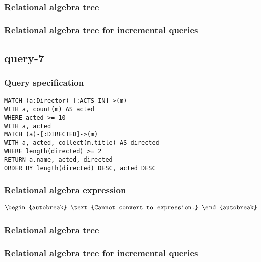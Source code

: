 \subsubsection*{Relational algebra tree}


\subsubsection*{Relational algebra tree for incremental queries}

\subsection{query-7}

\subsubsection*{Query specification}

\begin{lstlisting}
MATCH (a:Director)-[:ACTS_IN]->(m)
WITH a, count(m) AS acted
WHERE acted >= 10
WITH a, acted
MATCH (a)-[:DIRECTED]->(m)
WITH a, acted, collect(m.title) AS directed
WHERE length(directed) >= 2
RETURN a.name, acted, directed
ORDER BY length(directed) DESC, acted DESC
\end{lstlisting}

\subsubsection*{Relational algebra expression}

\begin{align*}
\begin{autobreak}
\text{Cannot convert to expression.}
\end{autobreak}
\end{align*}

\subsubsection*{Relational algebra tree}


\subsubsection*{Relational algebra tree for incremental queries}

